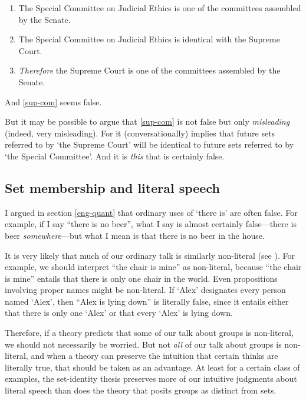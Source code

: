 \documentclass[11pt]{article}
\begin{document}
\begin{spacing}{1.5}
\begin{enumerate}[ref=(\arabic*)]
  \item The Special Committee on Judicial Ethics is one of the
    committees assembled by the Senate.

  \item The Special Committee on Judicial Ethics is identical with the
    Supreme Court.

  \item {\em Therefore} the Supreme Court is one of the committees
    assembled by the
    Senate. \citep[144]{uzquiano2004a} \label{sup-com}
\end{enumerate}

And \ref{sup-com} seems false.

But it may be possible to argue that \ref{sup-com} is not false but
only {\em misleading} (indeed, very misleading).  For it
(conversationally) implies that future sets referred to by `the
Supreme Court' will be identical to future sets referred to by `the
Special Committee'.  And it is {\em this} that is certainly false.

\subsection{Set membership and literal speech}
\label{implicate}
I argued in section \ref{eng-quant} that ordinary uses of `there is'
are often false.  For example, if I say ``there is no beer'', what I
say is almost certainly false---there is beer {\em somewhere}---but
what I mean is that there is no beer in the house.

It is very likely that much of our ordinary talk is similarly
non-literal (see \citet{bach1987}).  For example, we should interpret
``the chair is mine'' as non-literal, because ``the chair is mine''
entails that there is only one chair in the world.  Even propositions
involving proper names might be non-literal.  If `Alex' designates
every person named `Alex', then ``Alex is lying down'' is literally
false, since it entails either that there is only one `Alex' or that
every `Alex' is lying down.

Therefore, if a theory predicts that some of our talk about groups is
non-literal, we should not necessarily be worried.  But not {\em all}
of our talk about groups is non-literal, and when a theory can
preserve the intuition that certain thinks are literally true, that
should be taken as an advantage.  At least for a certain class of
examples, the set-identity thesis preserves more of our intuitive
judgments about literal speech than does the theory that posits
groups as distinct from sets.


\end{spacing}
\end{document}
